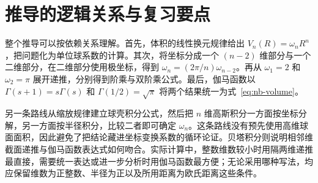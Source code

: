 \documentclass[UTF8]{ctexart}
\begin{document}
\section{推导的逻辑关系与复习要点}
\label{sec:nb-conclusion}

整个推导可以按依赖关系理解。首先，体积的线性换元规律给出 $V_n(R)=\omega_nR^n$，把问题化为单位球系数的计算。其次，将坐标分成一个 $(n-2)$ 维部分与一个二维部分，在二维部分使用极坐标，得到 $\omega_n=(2\pi/n)\omega_{n-2}$。再从 $\omega_1=2$ 和 $\omega_2=\pi$ 展开递推，分别得到阶乘与双阶乘公式。最后，伽马函数以 $\Gamma(s+1)=s\Gamma(s)$ 和 $\Gamma(1/2)=\sqrt\pi$ 将两个结果统一为式~\eqref{eq:nb-volume}。

另一条路线从缩放规律建立球壳积分公式，然后把 $n$ 维高斯积分一方面按坐标分解，另一方面按半径积分，比较二者即可确定 $\omega_n$。这条路线没有预先使用高维球面面积，因此避免了把结论藏进坐标变换系数的循环论证。贝塔积分则说明相邻维截面递推与伽马函数表达式如何吻合。实际计算中，整数维数较小时用隔两维递推最直接，需要统一表达或进一步分析时用伽马函数最方便；无论采用哪种写法，均应保留维数为正整数、半径为正以及所用距离为欧氏距离这些条件。
\end{document}
